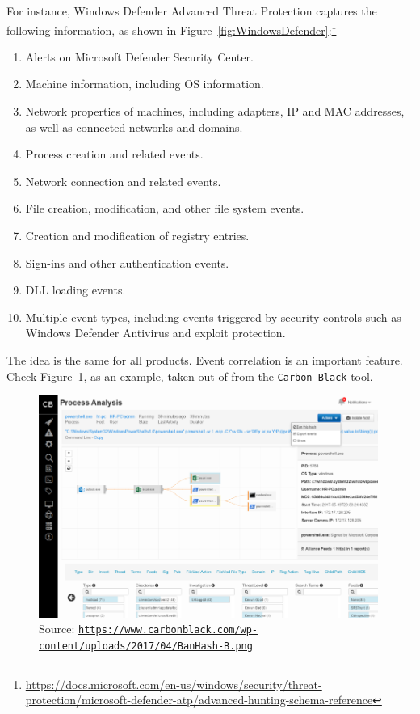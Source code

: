 For instance, Windows Defender Advanced Threat Protection captures the
following information\cite{MicrosoftDefenderAtp2020}, as shown in Figure~\ref{fig:WindowsDefender}:\footnote{\href{https://docs.microsoft.com/en-us/windows/security/threat-protection/microsoft-defender-atp/advanced-hunting-schema-reference}{https://docs.microsoft.com/en-us/windows/security/threat-protection/microsoft-defender-atp/advanced-hunting-schema-reference}}
\begin{enumerate}
\item Alerts on Microsoft Defender Security Center.
\item Machine information, including OS information.
\item Network properties of machines, including adapters, IP and MAC
  addresses, as well as connected networks and domains.
\item Process creation and related events.
\item Network connection and related
  events.
\item File creation, modification, and other file system events.
\item Creation and modification of registry entries.
\item Sign-ins and other authentication events.
\item DLL loading events.
\item Multiple event types, including events triggered by security controls
  such as Windows Defender Antivirus and exploit protection.
\end{enumerate}
The idea is the same for all products. Event correlation is an important
feature. Check Figure~\ref{fig:CarbonBlack}, as an example, taken out of from the
\texttt{Carbon Black}\cite{CarbonBlack2017} tool.
\begin{figure}
  \centering
  \includegraphics[width=0.99\textwidth]{./figures/CarbonBlack}
  \caption{\label{fig:CarbonBlack} Source: \href{https://www.carbonblack.com/wp-content/uploads/2017/04/BanHash-B.png}{\texttt{https://www.carbonblack.com/wp-content/uploads/2017/04/BanHash-B.png}}}
\end{figure}

